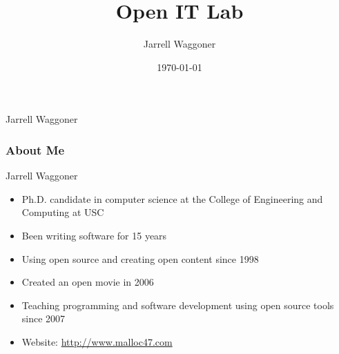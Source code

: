 \documentclass{beamer}
\title[Students]{Open IT Lab}
\author{Jarrell Waggoner}
\institute[Open IT Lab] {Open IT Lab\\
  \medskip
      {\emph{waggonej@email.sc.edu}} }
\date{\today}
\begin{document}
\rm

{
  \begin{frame}
    \vspace{18em}

    \begin{center}\large{\textcolor{beamer@mygrey}{Jarrell Waggoner}}\end{center}


  \end{frame}
}

\begin{frame}
  \frametitle{About Me}
  \begin{LARGE}
    Jarrell Waggoner
  \end{LARGE}
  \begin{Large}
    \begin{itemize}
    \item Ph.D. candidate in computer science at the College of
      Engineering and Computing at USC
    \item Been writing software for 15 years
    \item Using open source and creating open content since 1998
    \item Created an open movie in 2006
    \item Teaching programming and software development using open source tools since 2007
    \item Website: \textcolor{beamer@myblue}{\href{http://www.malloc47.com}{http://www.malloc47.com}}
    \end{itemize}
  \end{Large}
\end{frame}
\end{document}
